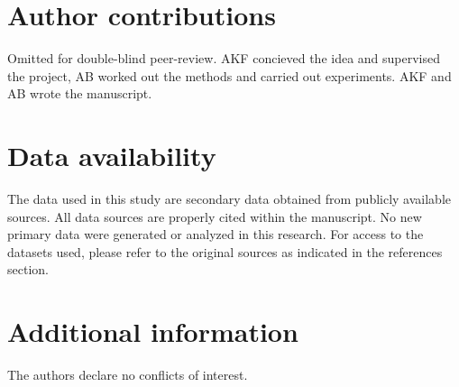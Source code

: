 \documentclass{article}
\begin{document}
\section*{Author contributions}
\ifdefined\DOUBLEBLINDREVIEW
Omitted for double-blind peer-review.
\else
AKF concieved the idea and supervised the project,  AB worked out the methods and carried out experiments. AKF and AB wrote the manuscript.
\fi 
\section*{Data availability}
The data used in this study are secondary data obtained from publicly available sources. All data sources are properly cited within the manuscript. No new primary data were generated or analyzed in this research. For access to the datasets used, please refer to the original sources as indicated in the references section.

\section*{Additional information}
The authors declare no conflicts of interest.
\end{document}
